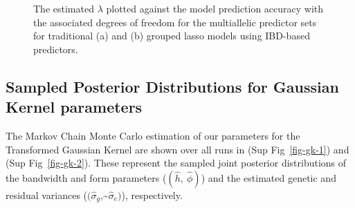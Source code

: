 \begin{figure}[h!]


\caption{\label{fig-lasso-2}The estimated \(\lambda\) plotted against
the model prediction accuracy with the associated degrees of freedom for
the multiallelic predictor sets for traditional (a) and (b) grouped
lasso models using IBD-based predictors.}

\end{figure}%

\subsection{Sampled Posterior Distributions for Gaussian Kernel
parameters}\label{sampled-posterior-distributions-for-gaussian-kernel-parameters}

The Markov Chain Monte Carlo estimation of our parameters for the
Transformed Gaussian Kernel are shown over all runs in (Sup
Fig~\ref{fig-gk-1}) and (Sup Fig~\ref{fig-gk-2}). These represent the
sampled joint posterior distributions of the bandwidth and form
parameters (\((\hat{h},~\hat{\phi})\)) and the estimated genetic and
residual variances
(\((\hat{\sigma}_g\),\textasciitilde{}\(\hat{\sigma}_e)\)),
respectively.

